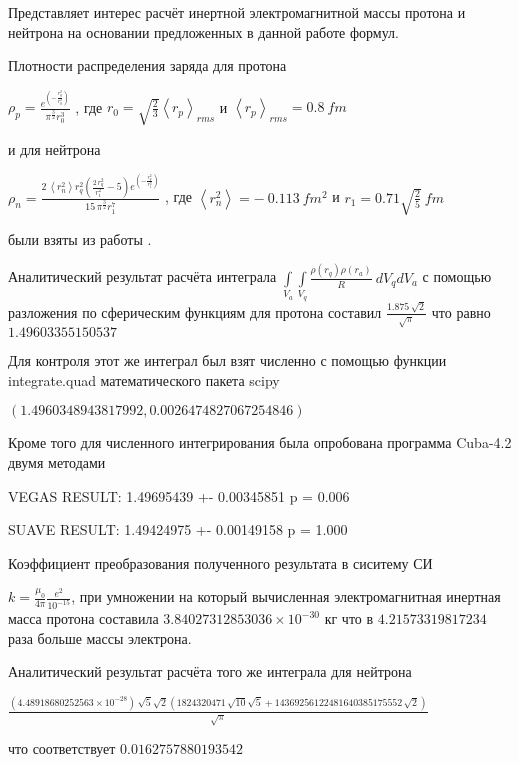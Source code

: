 \documentclass{article}
\begin{document}
Представляет интерес расчёт инертной электромагнитной массы протона и нейтрона на основании предложенных в данной работе формул. 

Плотности распределения заряда для протона

${{\rho}_{p}} = \frac{e^{\left(-\frac{r_{q}^{2}}{r_{0}^{2}}\right)}}{\pi^{\frac{3}{2}} r_{0}^{3}}$
, где
$r_{0} = \sqrt{\frac{2}{3}} \left< r_{p} \right>_{rms}$
и
$\left< r_{p} \right>_{rms} = 0.8 \ fm$

и для нейтрона

${{\rho}_{n}} = \frac{2 \, \left< r_{n}^{2} \right> r_{q}^{2} {\left(\frac{2 \, r_{q}^{2}}{r_{1}^{2}} - 5\right)} e^{\left(-\frac{r_{q}^{2}}{r_{1}^{2}}\right)}}{15 \, \pi^{\frac{3}{2}} r_{1}^{7}}$
, где
$\left< r_{n}^{2} \right> = -\ 0.113 \ fm^2$
и
$r_{1} = 0.71 \sqrt{\frac{2}{5}}\ fm$

были взяты из работы \cite{Haddad}.

Аналитический результат расчёта интеграла
$\int\limits_{{{V}_{a}}}{\int\limits_{{{V}_{q}}}{\frac{\rho \left( {{r}_{q}} \right)\rho \left( {{r}_{a}} \right)}{R}}}\ d{{V}_{q}}d{{V}_{a}}$ 
с помощью разложения по сферическим функциям для протона составил
$\frac{1.875 \, \sqrt{2}}{\sqrt{\pi}}$
что равно $1.49603355150537$

Для контроля этот же интеграл был взят численно с помощью функции integrate.quad математического пакета scipy

$(1.4960348943817992, 0.0026474827067254846)$

Кроме того для численного интегрирования была опробована программа Cuba-4.2 двумя методами

VEGAS RESULT:   1.49695439 +- 0.00345851        p = 0.006

SUAVE RESULT:   1.49424975 +- 0.00149158        p = 1.000

Коэффициент преобразования полученного результата в сиситему СИ

$k = \frac{{\mu}_{0}}{ 4 \pi} \frac{e^2}{ 10^{-15}}$, при умножении на который вычисленная электромагнитная инертная масса протона составила $3.84027312853036 \times 10^{-30}$ кг что в $4.21573319817234$ раза больше массы электрона.

Аналитический результат расчёта того же интеграла для нейтрона

$\frac{\left(4.48918680252563 \times 10^{-28}\right) \, \sqrt{5} \sqrt{2} {\left(1824320471 \, \sqrt{10} \sqrt{5} + 14369256122481640385175552 \, \sqrt{2}\right)}}{\sqrt{\pi}}$

что соответствует $0.0162757880193542$
\end{document}
